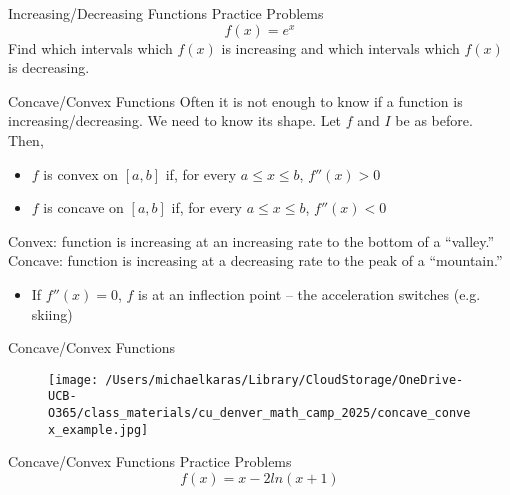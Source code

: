 \documentclass[aspectratio=169]{beamer}
\begin{document}
\begin{frame}{Increasing/Decreasing Functions Practice Problems}\label{main1}
	\vspace{-4cm}
     \[
    f(x) = e^{x}
    \]
    Find which intervals which \( f(x) \) is increasing and which intervals which \( f(x) \) is decreasing.
\end{frame}

\begin{frame}{Concave/Convex Functions}\label{main1}
    Often it is not enough to know if a function is increasing/decreasing. We need to know its shape. Let $f$ and $I$ be as before. Then,
    \begin{itemize}
        \item $f$ is convex on $[a, b]$ if, for every $a \leq x \leq b$, $f''(x) > 0$
        \item $f$ is concave on $[a, b]$ if, for every $a \leq x \leq b$, $f''(x) < 0$
    \end{itemize}
    Convex: function is increasing at an increasing rate to the bottom of a “valley.” Concave: function is increasing at a decreasing rate to the peak of a “mountain.”
    \begin{itemize}
        \item If $f''(x) = 0$, $f$ is at an inflection point – the acceleration switches (e.g. skiing)
    \end{itemize}
\end{frame}

\begin{frame}{Concave/Convex Functions}\label{main1}
    \begin{figure}
        \centering
        \texttt{[image: /Users/michaelkaras/Library/CloudStorage/OneDrive-UCB-O365/class\_materials/cu\_denver\_math\_camp\_2025/concave\_convex\_example.jpg]}
    \end{figure}
\end{frame}

\begin{frame}{Concave/Convex Functions Practice Problems}\label{main1}
	\vspace{-4cm}
     \[
    f(x) = x - 2ln(x+1)
    \]
\end{frame}
\end{document}
